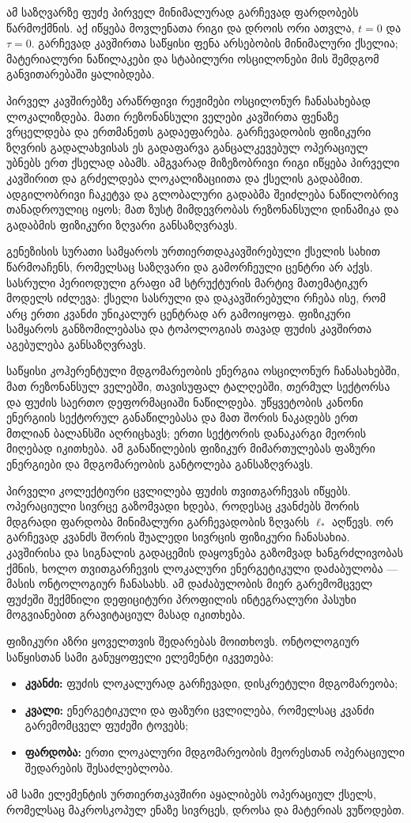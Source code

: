\documentclass[11pt,a4paper]{article}
\begin{document}
ამ საზღვარზე ფუძე პირველ მინიმალურად გარჩევად ფარდობებს წარმოქმნის. აქ იწყება მოვლენათა რიგი და დროის ორი ათვლა, $t=0$ და $\tau=0$. გარჩევად კავშირთა საწყისი ფენა არსებობის მინიმალური ქსელია; მატერიალური ნაწილაკები და სტაბილური ოსცილონები მის შემდგომ განვითარებაში ყალიბდება.

პირველ კავშირებზე არაწრფივი რეჟიმები ოსცილონურ ჩანასახებად ლოკალიზდება. მათი რეზონანსული ველები კავშირთა ფენაზე ვრცელდება და ერთმანეთს გადაეფარება. გარჩევადობის ფიზიკური ზღვრის გადალახვისას ეს გადაფარვა განცალკევებულ ოპერაციულ უბნებს ერთ ქსელად აბამს. ამგვარად მიზეზობრივი რიგი იწყება პირველი კავშირით და გრძელდება ლოკალიზაციითა და ქსელის გადაბმით. ადგილობრივი ჩაკეტვა და გლობალური გადაბმა შეიძლება ნაწილობრივ თანადროულიც იყოს; მათ ზუსტ მიმდევრობას რეზონანსული დინამიკა და გადაბმის ფიზიკური ზღვარი განსაზღვრავს.

გენეზისის სურათი სამყაროს ურთიერთდაკავშირებული ქსელის სახით წარმოაჩენს, რომელსაც საზღვარი და გამორჩეული ცენტრი არ აქვს. სასრული პერიოდული გრაფი ამ სტრუქტურის მარტივ მათემატიკურ მოდელს იძლევა: ქსელი სასრული და დაკავშირებული რჩება ისე, რომ არც ერთი კვანძი უნიკალურ ცენტრად არ გამოიყოფა. ფიზიკური სამყაროს განზომილებასა და ტოპოლოგიას თავად ფუძის კავშირთა აგებულება განსაზღვრავს.

საწყისი კოჰერენტული მდგომარეობის ენერგია ოსცილონურ ჩანასახებში, მათ რეზონანსულ ველებში, თავისუფალ ტალღებში, თერმულ სექტორსა და ფუძის საერთო დეფორმაციაში ნაწილდება. უწყვეტობის კანონი ენერგიის სექტორულ განაწილებასა და მათ შორის ნაკადებს ერთ მთლიან ბალანსში აღრიცხავს; ერთი სექტორის დანაკარგი მეორის მიღებად იკითხება. ამ განაწილების ფიზიკურ მიმართულებას ფაზური ენერგიები და მდგომარეობის განტოლება განსაზღვრავს.

პირველი კოლექტიური ცვლილება ფუძის თვითგარჩევას იწყებს. ოპერაციული სივრცე გაზომვადი ხდება, როდესაც კვანძებს შორის მდგრადი ფარდობა მინიმალური გარჩევადობის ზღვარს $\ell_*$ აღწევს. ორ გარჩევად კვანძს შორის შუალედი სივრცის ფიზიკური ჩანასახია. კავშირისა და სიგნალის გადაცემის დაყოვნება გაზომვად ხანგრძლივობას ქმნის, ხოლო თვითგარჩევის ლოკალური ენერგეტიკული დაძაბულობა — მასის ონტოლოგიურ ჩანასახს. ამ დაძაბულობის მიერ გარემომცველ ფუძეში შექმნილი დეფიციტური პროფილის ინტეგრალური პასუხი მოგვიანებით გრავიტაციულ მასად იკითხება.

ფიზიკური აზრი ყოველთვის შედარებას მოითხოვს. ონტოლოგიურ საწყისთან სამი განუყოფელი ელემენტი იკვეთება:

\begin{itemize}
\item \textbf{კვანძი:} ფუძის ლოკალურად გარჩევადი, დისკრეტული მდგომარეობა;
\item \textbf{კვალი:} ენერგეტიკული და ფაზური ცვლილება, რომელსაც კვანძი გარემომცველ ფუძეში ტოვებს;
\item \textbf{ფარდობა:} ერთი ლოკალური მდგომარეობის მეორესთან ოპერაციული შედარების შესაძლებლობა.

\end{itemize}
ამ სამი ელემენტის ურთიერთკავშირი აყალიბებს ოპერაციულ ქსელს, რომელსაც მაკროსკოპულ ენაზე სივრცეს, დროსა და მატერიას ვუწოდებთ.
\end{document}
